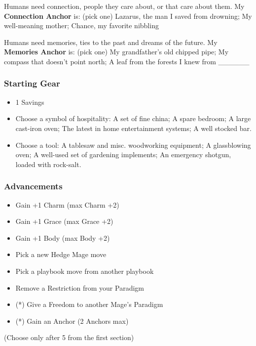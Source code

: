 \documentclass[
]{article}
\providecommand{\tightlist}{%
  \setlength{\itemsep}{0pt}\setlength{\parskip}{0pt}}
\begin{document}
Humans need connection, people they care about, or that care about them.
My \textbf{Connection Anchor} is: (pick one) Lazarus, the man I saved
from drowning; My well-meaning mother; Chance, my favorite nibbling

Humans need memories, ties to the past and dreams of the future. My
\textbf{Memories Anchor} is: (pick one) My grandfather's old chipped
pipe; My compass that doesn't point north; A leaf from the forests I
knew from \_\_\_\_\_\_

\hypertarget{starting-gear-2}{%
\subsubsection{Starting Gear}\label{starting-gear-2}}

\begin{itemize}
\tightlist
\item
  1 Savings
\item
  Choose a symbol of hospitality: A set of fine china; A spare bedroom;
  A large cast-iron oven; The latest in home entertainment systems; A
  well stocked bar.
\item
  Choose a tool: A tablesaw and misc. woodworking equipment; A
  glassblowing oven; A well-used set of gardening implements; An
  emergency shotgun, loaded with rock-salt.
\end{itemize}

\hypertarget{advancements-2}{%
\subsubsection{Advancements}\label{advancements-2}}

\begin{itemize}
\tightlist
\item
  Gain +1 Charm (max Charm +2)
\item
  Gain +1 Grace (max Grace +2)
\item
  Gain +1 Body (max Body +2)
\item
  Pick a new Hedge Mage move
\item
  Pick a playbook move from another playbook
\item
  Remove a Restriction from your Paradigm
\item
  (*) Give a Freedom to another Mage's Paradigm
\item
  (*) Gain an Anchor (2 Anchors max)
\end{itemize}

(Choose only after 5 from the first section)
\end{document}

